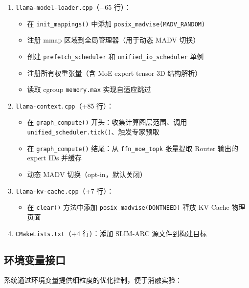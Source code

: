 \begin{enumerate}
    \item \texttt{llama-model-loader.cpp}（+65 行）：
    \begin{itemize}
        \item 在 \texttt{init\_mappings()} 中添加 \texttt{posix\_madvise(MADV\_RANDOM)}
        \item 注册 mmap 区域到全局管理器（用于动态 MADV 切换）
        \item 创建 \texttt{prefetch\_scheduler} 和 \texttt{unified\_io\_scheduler} 单例
        \item 注册所有权重张量（含 MoE expert tensor 3D 结构解析）
        \item 读取 cgroup \texttt{memory.max} 实现自适应跳过
    \end{itemize}
    
    \item \texttt{llama-context.cpp}（+85 行）：
    \begin{itemize}
        \item 在 \texttt{graph\_compute()} 开头：收集计算图层范围、调用 \texttt{unified\_scheduler.tick()}、触发专家预取
        \item 在 \texttt{graph\_compute()} 结尾：从 \texttt{ffn\_moe\_topk} 张量提取 Router 输出的 expert IDs 并缓存
        \item 动态 MADV 切换（opt-in，默认关闭）
    \end{itemize}
    
    \item \texttt{llama-kv-cache.cpp}（+7 行）：
    \begin{itemize}
        \item 在 \texttt{clear()} 方法中添加 \texttt{posix\_madvise(DONTNEED)} 释放 KV Cache 物理页面
    \end{itemize}
    
    \item \texttt{CMakeLists.txt}（+4 行）：添加 SLIM-ARC 源文件到构建目标
\end{enumerate}

\subsection{环境变量接口}

系统通过环境变量提供细粒度的优化控制，便于消融实验：

